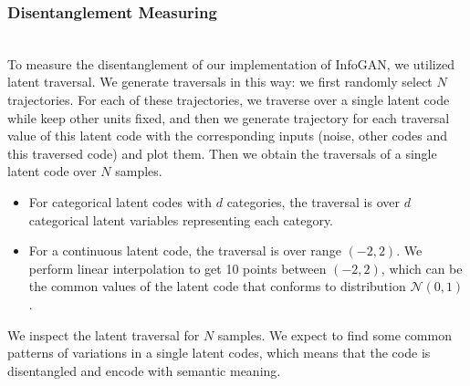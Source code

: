 \subsubsection{Disentanglement Measuring}
\hfill \\
To measure the disentanglement of our implementation of InfoGAN, we utilized latent traversal. We generate traversals in this way: we first randomly select $N$ trajectories. For each of these trajectories, we traverse over a single latent code while keep other units fixed, and then we generate trajectory for each traversal value of this latent code with the corresponding inputs (noise, other codes and this traversed code) and plot them. Then we obtain the traversals of a single latent code over $N$ samples.

\begin{itemize}
  \item For categorical latent codes with $d$ categories, the traversal is over $d$ categorical latent variables representing each category.
  \item For a continuous latent code, the traversal is over range $(-2, 2)$. We perform linear interpolation to get 10 points between $(-2, 2)$, which can be the common values of the latent code that conforms to distribution $\mathcal{N}(0, 1)$.
\end{itemize}

We inspect the latent traversal for $N$ samples. We expect to find some common patterns of variations in a single latent codes, which means that the code is disentangled and encode with semantic meaning.
